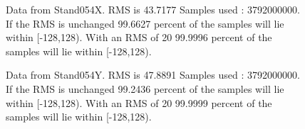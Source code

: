 \begin{figure}[ht] 				 				 				\caption{Data from Stand054X. RMS is 43.7177 Samples used : 3792000000. If the RMS is unchanged 99.6627 percent of the samples will lie within [-128,128).  				 With an RMS of 20 99.9996 percent of the samples will lie within [-128,128).} 				\end{figure} 

\begin{figure}[ht] 				 				 				\caption{Data from Stand054Y. RMS is 47.8891 Samples used : 3792000000. If the RMS is unchanged 99.2436 percent of the samples will lie within [-128,128).  				 With an RMS of 20 99.9999 percent of the samples will lie within [-128,128).} 				\end{figure} 

